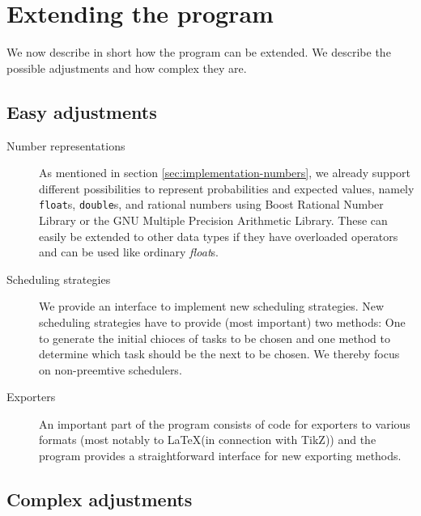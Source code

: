 \section{Extending the program}
\label{sec:implementation-extending-program}

We now describe in short how the program can be extended. We describe the possible adjustments and how complex they are.

\subsection{Easy adjustments}
\label{sec:implementation-extensions-easy}

\begin{description}
\item[Number representations] As mentioned in section \ref{sec:implementation-numbers}, we already support different possibilities to represent probabilities and expected values, namely \texttt{float}s, \texttt{double}s, and rational numbers using Boost Rational Number Library or the GNU Multiple Precision Arithmetic Library. These can easily be extended to other data types if they have overloaded operators and can be used like ordinary \emph{float}s.
\item[Scheduling strategies] We provide an interface to implement new scheduling strategies. New scheduling strategies have to provide (most important) two methods: One to generate the initial chioces of tasks to be chosen and one method to determine which task should be the next to be chosen. We thereby focus on non-preemtive schedulers.
\item[Exporters] An important part of the program consists of code for exporters to various formats (most notably to \LaTeX (in connection with TikZ)) and the program provides a straightforward interface for new exporting methods.
\end{description}

\subsection{Complex adjustments}
\label{sec:implementations-extensions-moderate}

